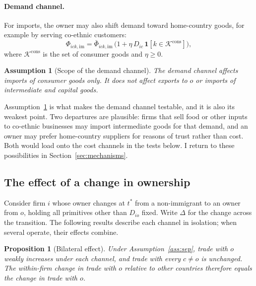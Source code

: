 \documentclass[12pt]{article}
\newtheorem{proposition}{Proposition}
\newtheorem{assumption}{Assumption}
\theoremstyle{remark}
\newcommand{\one}{\mathbf{1}}
\begin{document}
\paragraph{Demand channel.} For imports, the owner may also shift demand
toward home-country goods, for example by serving co-ethnic customers:
\begin{equation}
\Phi_{ick,\text{im}} = \bar\Phi_{ick,\text{im}}\,\big(1+\eta\,D_{ic}\,\one[k\in\mathcal{K}^{\text{cons}}]\big),
\label{eq:demand}
\end{equation}
where $\mathcal{K}^{\text{cons}}$ is the set of consumer goods and $\eta\geq0$.

\begin{assumption}[Scope of the demand channel]\label{ass:demand}
The demand channel affects imports of consumer goods only. It does not affect
exports to $o$ or imports of intermediate and capital goods.
\end{assumption}

Assumption~\ref{ass:demand} is what makes the demand channel testable, and it
is also its weakest point. Two departures are plausible: firms that sell
food or other inputs to co-ethnic businesses may import intermediate goods
for that demand, and an owner may prefer home-country suppliers for reasons of
trust rather than cost. Both would load onto the cost channels in the tests
below. I return to these possibilities in Section~\ref{sec:mechanisms}.

\subsection{The effect of a change in ownership}

Consider firm $i$ whose owner changes at $t^*$ from a non-immigrant to an
owner from $o$, holding all primitives other than $D_{io}$ fixed. Write
$\Delta$ for the change across the transition. The following results describe
each channel in isolation; when several operate, their effects combine.

\begin{proposition}[Bilateral effect]\label{prop:bilateral}
Under Assumption~\ref{ass:sep}, trade with $o$ weakly increases under each
channel, and trade with every $c\neq o$ is unchanged. The within-firm change in
trade with $o$ relative to other countries therefore equals the change in
trade with $o$.
\end{proposition}
\end{document}
